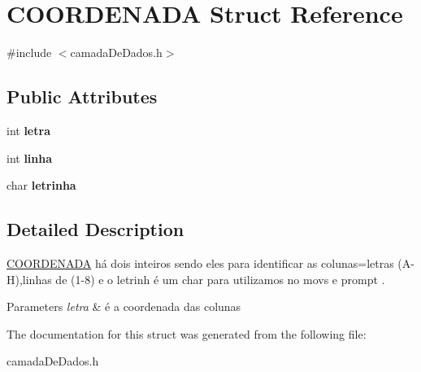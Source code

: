 \hypertarget{structCOORDENADA}{}\section{C\+O\+O\+R\+D\+E\+N\+A\+DA Struct Reference}
\label{structCOORDENADA}


{\ttfamily \#include $<$camada\+De\+Dados.\+h$>$}

\subsection*{Public Attributes}
\begin{DoxyCompactItemize}
\item 
\mbox{\label{structCOORDENADA_acb526f8ae91ba6a2742ef1a9473fa2b4}} 
int {\bfseries letra}
\item 
\mbox{\label{structCOORDENADA_aefe14bcc5a066ac3b21500cc3d28c06f}} 
int {\bfseries linha}
\item 
\mbox{\label{structCOORDENADA_ac00ff2e615b371a3d87fbb05449cde99}} 
char {\bfseries letrinha}
\end{DoxyCompactItemize}


\subsection{Detailed Description}
\hyperlink{structCOORDENADA}{C\+O\+O\+R\+D\+E\+N\+A\+DA} há dois inteiros sendo eles para identificar as colunas=letras (A-\/H),linhas de (1-\/8) e o letrinh é um char para utilizamos no movs e prompt . 
\begin{DoxyParams}{Parameters}
{\em letra} & é a coordenada das colunas \\
\hline
\end{DoxyParams}


The documentation for this struct was generated from the following file\+:\begin{DoxyCompactItemize}
\item 
camada\+De\+Dados.\+h\end{DoxyCompactItemize}
